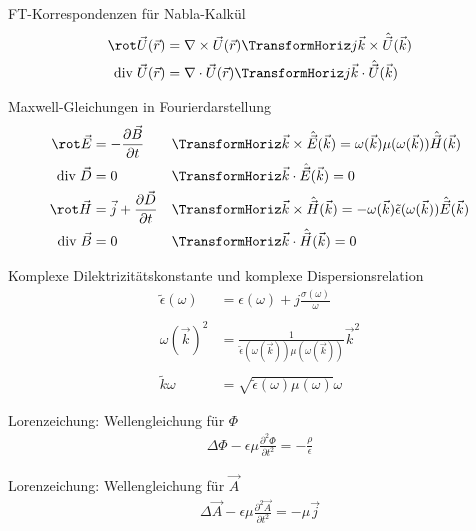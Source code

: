 \documentclass[a6paper]{kartei}
\renewcommand{\div}{\mathrm{div}\;}
\newcommand{\fa}{\TransformHoriz}
\begin{document}
\begin{karte}{FT-Korrespondenzen für Nabla-Kalkül}
\begin{align}
\rot \vec{U}(\vec{r}) & = \nabla \times \vec{U}(\vec{r}) \fa j\vec{k} \times \hat{\vec{U}}(\vec{k}) \\
\div \vec{U}(\vec{r}) & = \nabla \cdot \vec{U}(\vec{r}) \fa j\vec{k} \cdot \hat{\vec{U}}(\vec{k})
\end{align}
\end{karte}

\begin{karte}{Maxwell-Gleichungen in Fourierdarstellung}
\begin{align}
\rot \vec{E} & = -\frac{\partial \vec{B}}{\partial t} &\fa& \vec{k} \times \hat{\vec{E}}(\vec{k}) = \omega(\vec{k})  \mu(\omega(\vec{k}))  \hat{\vec{H}}(\vec{k}) \\
\div \vec{D} & = 0  &\fa& \vec{k} \cdot \hat{\vec{E}}(\vec{k}) = 0 \\
\rot \vec{H} & = \vec{j} + \frac{\partial \vec{D}}{\partial t}  &\fa& \vec{k} \times \hat{\vec{H}}(\vec{k}) = -\omega(\vec{k})  \tilde{\epsilon} (\omega(\vec{k}))  \hat{\vec{E}}(\vec{k}) \\
\div \vec{B} & = 0 &\fa& \vec{k} \cdot \hat{\vec{H}}(\vec{k}) = 0
\end{align}
\end{karte}

\begin{karte}{Komplexe Dilektrizitätskonstante und komplexe Dispersionsrelation}
\begin{align}
\tilde{\epsilon}(\omega) & = \epsilon(\omega) + j \frac{\sigma(\omega)}{\omega} \\
\nonumber \\
\omega(\vec{k})^{2} & = \frac{1}{\tilde{\epsilon}(\omega(\vec{k})) \mu(\omega(\vec{k}))} \vec{k}^{2} \\
\nonumber \\
\tilde{k}{\omega} &= \sqrt{\tilde{\epsilon}(\omega) \mu(\omega)} \omega
\end{align}
\end{karte}
\begin{karte}{Lorenzeichung: Wellengleichung für $\Phi$}
\begin{eqnarray*}
\Delta \Phi - \epsilon \mu \frac{\partial^{2}\Phi}{\partial t^{2}} = -\frac{\rho}{\epsilon}
\end{eqnarray*}
\end{karte}

\begin{karte}{Lorenzeichung: Wellengleichung für $\vec{A}$}
\begin{eqnarray}
 \Delta \vec{A} - \epsilon \mu \frac{\partial^{2}\vec{A}}{\partial t^{2}} = - \mu\vec{j}
\end{eqnarray}
\end{karte}
\end{document}
